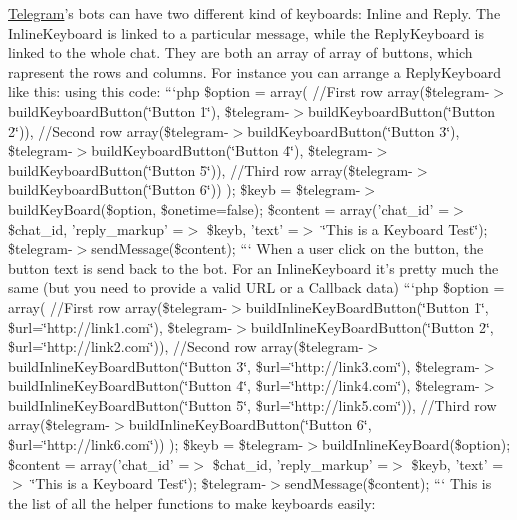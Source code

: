 \hyperlink{class_telegram}{Telegram}'s bots can have two different kind of keyboards\-: Inline and Reply. The Inline\-Keyboard is linked to a particular message, while the Reply\-Keyboard is linked to the whole chat. They are both an array of array of buttons, which rapresent the rows and columns. For instance you can arrange a Reply\-Keyboard like this\-:  using this code\-: ```php \$option = array( //\-First row array(\$telegram-\/$>$build\-Keyboard\-Button(\char`\"{}\-Button 1\char`\"{}), \$telegram-\/$>$build\-Keyboard\-Button(\char`\"{}\-Button 2\char`\"{})), //\-Second row array(\$telegram-\/$>$build\-Keyboard\-Button(\char`\"{}\-Button 3\char`\"{}), \$telegram-\/$>$build\-Keyboard\-Button(\char`\"{}\-Button 4\char`\"{}), \$telegram-\/$>$build\-Keyboard\-Button(\char`\"{}\-Button 5\char`\"{})), //\-Third row array(\$telegram-\/$>$build\-Keyboard\-Button(\char`\"{}\-Button 6\char`\"{})) ); \$keyb = \$telegram-\/$>$build\-Key\-Board(\$option, \$onetime=false); \$content = array('chat\-\_\-id' =$>$ \$chat\-\_\-id, 'reply\-\_\-markup' =$>$ \$keyb, 'text' =$>$ \char`\"{}\-This is a Keyboard Test\char`\"{}); \$telegram-\/$>$send\-Message(\$content); ``` When a user click on the button, the button text is send back to the bot. For an Inline\-Keyboard it's pretty much the same (but you need to provide a valid U\-R\-L or a Callback data)  ```php \$option = array( //\-First row array(\$telegram-\/$>$build\-Inline\-Key\-Board\-Button(\char`\"{}\-Button 1\char`\"{}, \$url=\char`\"{}http\-://link1.\-com\char`\"{}), \$telegram-\/$>$build\-Inline\-Key\-Board\-Button(\char`\"{}\-Button 2\char`\"{}, \$url=\char`\"{}http\-://link2.\-com\char`\"{})), //\-Second row array(\$telegram-\/$>$build\-Inline\-Key\-Board\-Button(\char`\"{}\-Button 3\char`\"{}, \$url=\char`\"{}http\-://link3.\-com\char`\"{}), \$telegram-\/$>$build\-Inline\-Key\-Board\-Button(\char`\"{}\-Button 4\char`\"{}, \$url=\char`\"{}http\-://link4.\-com\char`\"{}), \$telegram-\/$>$build\-Inline\-Key\-Board\-Button(\char`\"{}\-Button 5\char`\"{}, \$url=\char`\"{}http\-://link5.\-com\char`\"{})), //\-Third row array(\$telegram-\/$>$build\-Inline\-Key\-Board\-Button(\char`\"{}\-Button 6\char`\"{}, \$url=\char`\"{}http\-://link6.\-com\char`\"{})) ); \$keyb = \$telegram-\/$>$build\-Inline\-Key\-Board(\$option); \$content = array('chat\-\_\-id' =$>$ \$chat\-\_\-id, 'reply\-\_\-markup' =$>$ \$keyb, 'text' =$>$ \char`\"{}\-This is a Keyboard Test\char`\"{}); \$telegram-\/$>$send\-Message(\$content); ``` This is the list of all the helper functions to make keyboards easily\-:

